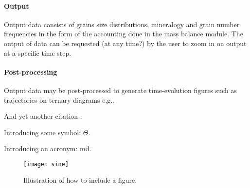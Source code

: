 \paragraph{Output}
Output data consists of grains size distributions, mineralogy and grain number frequencies in the form of the accounting done in the mass balance module. The output of data can be requested (at any time?) by the user to zoom in on output at a specific time step.

\paragraph{Post-processing}
Output data may be post-processed to generate time-evolution figures such as trajectories on ternary diagrams e.g..

And yet another citation \cite{FrRo2010Diffusion}.

Introducing some symbol: $\Theta$.

Introducing an acronym: \gls{md}.

\begin{figure}
  \centering
  \medskip
  \texttt{[image: sine]}
  \caption{Illustration of how to include a figure. }
  \label{fig:sine}
\end{figure}





\cleardoublepage

